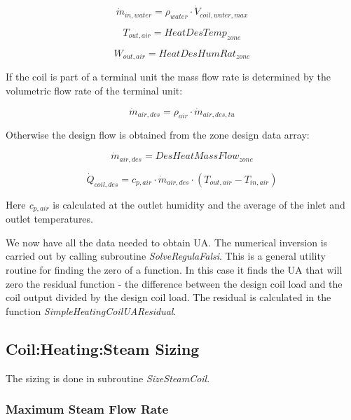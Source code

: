 \begin{equation}
\dot m_{in,water} = \rho_{water} \cdot \dot V_{coil,water,max}
\end{equation}

\begin{equation}
T_{out,air} = HeatDesTemp_{zone}
\end{equation}

\begin{equation}
W_{out,air} = HeatDesHumRat_{zone}
\end{equation}

If the coil is part of a terminal unit the mass flow rate is determined by the volumetric flow rate of the terminal unit:

\begin{equation}
\dot m_{air,des} = \rho_{air} \cdot \dot m_{air,des,tu}
\end{equation}

Otherwise the design flow is obtained from the zone design data array:

\begin{equation}
\dot m_{air,des} = DesHeatMassFlow_{zone}
\end{equation}

\begin{equation}
\dot Q_{coil,des} = c_{p,air} \cdot \dot m_{air,des} \cdot (T_{out,air} - T_{in,air})
\end{equation}

Here \emph{c\(_{p,air}\)} is calculated at the outlet humidity and the average of the inlet and outlet temperatures.

We now have all the data needed to obtain UA. The numerical inversion is carried out by calling subroutine \emph{SolveRegulaFalsi}. This is a general utility routine for finding the zero of a function. In this case it finds the UA that will zero the residual function - the difference between the design coil load and the coil output divided by the design coil load. The residual is calculated in the function \emph{SimpleHeatingCoilUAResidual}.

\subsection{Coil:Heating:Steam Sizing}\label{coilheatingsteam-sizing}

The sizing is done in subroutine \emph{SizeSteamCoil}.

\subsubsection{Maximum Steam Flow Rate}\label{maximum-steam-flow-rate}

